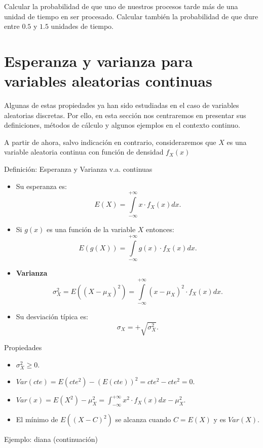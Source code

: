 \documentclass[
  letterpaper,
  DIV=11,
  numbers=noendperiod]{scrreprt}
\providecommand{\tightlist}{%
  \setlength{\itemsep}{0pt}\setlength{\parskip}{0pt}}\usepackage{longtable,booktabs,array}
\begin{document}
Calcular la probabilidad de que uno de nuestros procesos tarde más de
una unidad de tiempo en ser procesado. Calcular también la probabilidad
de que dure entre \(0.5\) y \(1.5\) unidades de tiempo.

\section{Esperanza y varianza para variables aleatorias
continuas}\label{esperanza-y-varianza-para-variables-aleatorias-continuas}

Algunas de estas propiedades ya han sido estudiadas en el caso de
variables aleatorias discretas. Por ello, en esta sección nos
centraremos en presentar sus definiciones, métodos de cálculo y algunos
ejemplos en el contexto continuo.

A partir de ahora, salvo indicación en contrario, consideraremos que
\(X\) es una variable aleatoria continua con función de densidad
\(f_{X}(x)\)

Definición: Esperanza y Varianza v.a. continuas

\begin{itemize}
\tightlist
\item
  Su esperanza es:
  \[E(X)=\displaystyle\int\limits_{-\infty}^{+\infty} x\cdot f_{X}(x)dx.\]
\item
  Si \(g(x)\) es una función de la variable \(X\) entonces:
  \[E(g(X))=\displaystyle\int\limits_{-\infty}^{+\infty} g(x)\cdot f_{X}(x)dx.\]
\item
  \textbf{Varianza} \[\sigma_{X}^2=E((X-\mu_{X})^2)=
    \displaystyle\int\limits_{-\infty}^{+\infty} (x-\mu_{X})^2 \cdot f_{X}(x)dx.
    \]
\item
  Su desviación típica es: \[\sigma_{X}=+\sqrt{\sigma_{X}^2}.\]
\end{itemize}

Propiedades

\begin{itemize}
\tightlist
\item
  \(\sigma_{X}^2\geq 0\).
\item
  \(Var(cte)=E(cte^2)-(E(cte))^2= cte^2 - cte^2=0\).
\item
  \(\displaystyle Var(x)=E(X^2)-\mu_{X}^2=\int_{-\infty}^{+\infty}x^2\cdot  f_{X}(x)dx - \mu_{X}^2.\)
\item
  El mínimo de \(E((X-C)^2)\) se alcanza cuando \(C=E(X)\) y es
  \(Var(X)\).
\end{itemize}

Ejemplo: diana (continuación)
\end{document}
